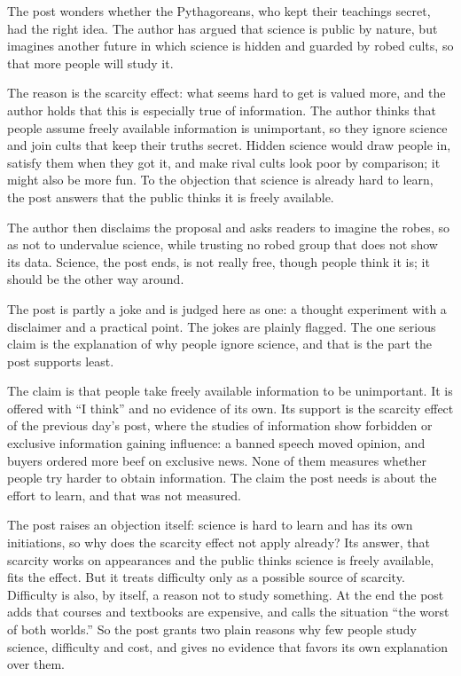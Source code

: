 \begin{afterword}
\summaryhead

The post wonders whether the Pythagoreans, who kept their teachings secret, had the right idea. The author has argued that science is public by nature, but imagines another future in which science is hidden and guarded by robed cults, so that more people will study it.

The reason is the scarcity effect: what seems hard to get is valued more, and the author holds that this is especially true of information. The author thinks that people assume freely available information is unimportant, so they ignore science and join cults that keep their truths secret. Hidden science would draw people in, satisfy them when they got it, and make rival cults look poor by comparison; it might also be more fun. To the objection that science is already hard to learn, the post answers that the public thinks it is freely available.

The author then disclaims the proposal and asks readers to imagine the robes, so as not to undervalue science, while trusting no robed group that does not show its data. Science, the post ends, is not really free, though people think it is; it should be the other way around.

\responsehead

The post is partly a joke and is judged here as one: a thought experiment with a disclaimer and a practical point. The jokes are plainly flagged. The one serious claim is the explanation of why people ignore science, and that is the part the post supports least.

The claim is that people take freely available information to be unimportant. It is offered with ``I think'' and no evidence of its own. Its support is the scarcity effect of the previous day's post, where the studies of information show forbidden or exclusive information gaining influence: a banned speech moved opinion, and buyers ordered more beef on exclusive news. None of them measures whether people try harder to obtain information. The claim the post needs is about the effort to learn, and that was not measured.

The post raises an objection itself: science is hard to learn and has its own initiations, so why does the scarcity effect not apply already? Its answer, that scarcity works on appearances and the public thinks science is freely available, fits the effect. But it treats difficulty only as a possible source of scarcity. Difficulty is also, by itself, a reason not to study something. At the end the post adds that courses and textbooks are expensive, and calls the situation ``the worst of both worlds.'' So the post grants two plain reasons why few people study science, difficulty and cost, and gives no evidence that favors its own explanation over them.


\end{afterword}
